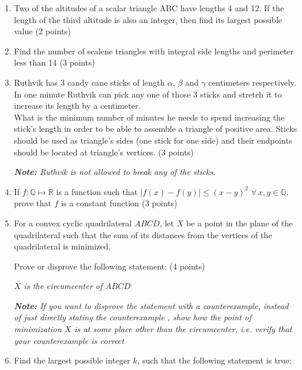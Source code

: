 \documentclass[12pt]{article}
\theoremstyle{definition}
\begin{document}
\begin{enumerate}
    \item Two of the altitudes of a scalar triangle ABC have lengths 4 and 12. If the length of the third altitude is also an integer, then find its largest possible value (2 points)
    
    \item Find the number of scalene triangles with integral side lengths and perimeter less than 14 (3 points)
    
    \item Ruthvik has 3 candy cane sticks of length $\alpha$, $\beta$ and $\gamma$ centimeters respectively. In one minute Ruthvik can pick any one of those 3 sticks and stretch it to increase its length by a centimeter.
    \newline\\
    What is the minimum number of minutes he needs to spend increasing the stick's length in order to be able to assemble a triangle of positive area. Sticks should be used as triangle's sides (one stick for one side) and their endpoints should be located at triangle's vertices. (3 points)

    \textit{\textbf{Note:} Ruthvik is not allowed to break any of the sticks.}

    \item If $f \colon \mathbb{Q} \mapsto \mathbb{R}$ is a function such that $|f(x)-f(y)| \leq (x-y)^{2} $ $\forall\, x,y \in \mathbb{Q}$, prove that $f$ is a constant function (3 points)
    
    \item For a convex cyclic quadrilateral $ABCD$, let $X$ be a point in the plane of the quadrilateral such that the sum of its distances from the vertices of the quadrilateral is minimized.
    
    Prove or disprove the following statement: (4 points)
    \begin{center}
        \textit{$X$ is the circumcenter of $ABCD$}
    \end{center}

    \textit{\textbf{Note:} If you want to disprove the statement with a counterexample, instead of just directly stating the counterexample , show how the point of minimization $X$ is at some place other than the circumcenter, i.e. verify that your counterexample is correct}
    
    \item Find the largest possible integer $k$, such that the following statement is true:
    

\end{enumerate}
\end{document}
